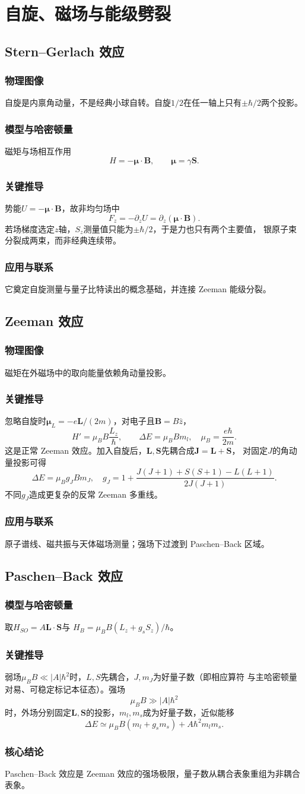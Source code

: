 \documentclass[12pt,a4paper,openany,fontset=fandol]{ctexrep}
\newcommand{\Physical}{\subsection*{物理图像}}
\newcommand{\Model}{\subsection*{模型与哈密顿量}}
\newcommand{\Derivation}{\subsection*{关键推导}}
\newcommand{\Conclusion}{\subsection*{核心结论}}
\newcommand{\Application}{\subsection*{应用与联系}}
\begin{document}
\chapter{自旋、磁场与能级劈裂}
\section{Stern--Gerlach 效应}
\Physical
自旋是内禀角动量，不是经典小球自转。自旋$1/2$在任一轴上只有$\pm\hbar/2$两个投影。
\Model
磁矩与场相互作用
\begin{equation}H=-\bm\mu\cdot\bm B,\qquad \bm\mu=\gamma\bm S.\end{equation}
\Derivation
势能$U=-\bm\mu\cdot\bm B$，故非均匀场中
\begin{equation}F_z=-\partial_zU=\partial_z(\bm\mu\cdot\bm B).\end{equation}
若场梯度选定$z$轴，$S_z$测量值只能为$\pm\hbar/2$，于是力也只有两个主要值，
银原子束分裂成两束，而非经典连续带。
\Application
它奠定自旋测量与量子比特读出的概念基础，并连接 Zeeman 能级分裂。

\section{Zeeman 效应}
\Physical
磁矩在外磁场中的取向能量依赖角动量投影。
\Derivation
忽略自旋时$\bm\mu_L=-e\bm L/(2m)$，对电子且$\bm B=B\hat z$，
\begin{equation}H'=\mu_BB\frac{L_z}{\hbar},\qquad
\Delta E=\mu_BBm_l,\quad \mu_B=\frac{e\hbar}{2m}.\end{equation}
这是正常 Zeeman 效应。加入自旋后，$\bm L,\bm S$先耦合成$\bm J=\bm L+\bm S$，
对固定$J$的角动量投影可得
\begin{equation}\Delta E=\mu_Bg_JBm_J,\quad
g_J=1+\frac{J(J+1)+S(S+1)-L(L+1)}{2J(J+1)}.\end{equation}
不同$g_J$造成更复杂的反常 Zeeman 多重线。
\Application
原子谱线、磁共振与天体磁场测量；强场下过渡到 Paschen--Back 区域。

\section{Paschen--Back 效应}
\Model
取$H_{SO}=A\bm L\cdot\bm S$与
$H_B=\mu_BB(L_z+g_sS_z)/\hbar$。
\Derivation
弱场$\mu_BB\ll |A|\hbar^2$时，$L,S$先耦合，$J,m_J$为好量子数（即相应算符
与主哈密顿量对易、可稳定标记本征态）。强场
\[
\mu_BB\gg |A|\hbar^2
\]
时，外场分别固定$\bm L,\bm S$的投影，$m_l,m_s$成为好量子数，近似能移
\[
\Delta E\simeq\mu_BB(m_l+g_sm_s)+A\hbar^2m_lm_s.
\]
\Conclusion
Paschen--Back 效应是 Zeeman 效应的强场极限，量子数从耦合表象重组为非耦合表象。
\end{document}
